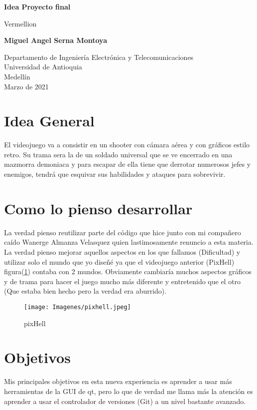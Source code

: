 \documentclass{article}
\begin{document}
\begin{titlepage}
    \begin{center}
        \vspace*{1cm}
            
        \Huge
        \textbf{Idea Proyecto final}
            
        \vspace{0.5cm}
        \LARGE
        Vermellion
            
        \vspace{1.5cm}
        \textbf{Miguel Angel Serna Montoya}
            
        \vfill
            
        \vspace{0.8cm}
            
        \Large
        Departamento de Ingeniería Electrónica y Telecomunicaciones\\
        Universidad de Antioquia\\
        Medellín\\
        Marzo de 2021
            
    \end{center}
\end{titlepage}

\tableofcontents

\section{Idea General}
El videojuego va a consistir en un shooter con cámara aérea y con gráficos estilo retro. Su trama sera la de un soldado universal que se ve encerrado en una mazmorra demoniaca y para escapar de ella tiene que derrotar numerosos jefes y enemigos, tendrá que esquivar sus habilidades y ataques para sobrevivir. 

\section{Como lo pienso desarrollar} \label{contenido}
La verdad pienso reutilizar parte del código que hice junto con mi compañero caído Wanerge Almanza Velasquez quien lastimosamente renuncio a esta materia. La verdad pienso mejorar aquellos aspectos en los que fallamos (Dificultad) y utilizar solo el mundo que yo diseñé ya que el videojuego anterior (PixHell) figura(\ref{fig:pixhell}) contaba con 2 mundos.
Obviamente cambiaría muchos aspectos gráficos y de trama para hacer el juego mucho más diferente y entretenido que el otro (Que estaba bien hecho pero la verdad era aburrido).
\begin{figure}[h]
\texttt{[image: Imagenes/pixhell.jpeg]}
\centering
\caption{pixHell}
\label{fig:pixhell}
\end{figure}
\section{Objetivos} \label{contenido}
Mis principales objetivos en esta nueva experiencia es aprender a usar más herramientas de la GUI de qt, pero lo que de verdad me llama más la atención es aprender a usar el controlador de versiones (Git) a un nivel bastante avanzado.
\end{document}
